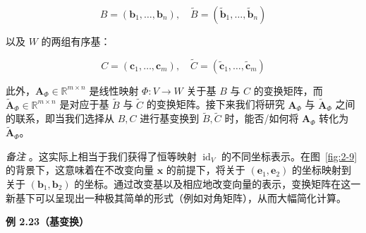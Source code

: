 \begin{equation}
B = (\boldsymbol{b}_1, \ldots, \boldsymbol{b}_n), \quad \tilde{B} = (\tilde{\boldsymbol{b}}_1, \ldots, \tilde{\boldsymbol{b}}_n)
\tag{2.98}\label{eq:2-98}
\end{equation}

以及 $ W $ 的两组有序基：

\begin{equation}
C = (\boldsymbol{c}_1, \ldots, \boldsymbol{c}_m), \quad \tilde{C} = (\tilde{\boldsymbol{c}}_1, \ldots, \tilde{\boldsymbol{c}}_m)
\tag{2.99}\label{eq:2-99}
\end{equation}

此外，$ \boldsymbol{A}_\Phi \in \mathbb{R}^{m \times n} $ 是线性映射 $ \Phi : V \to W $ 关于基 $ B $ 与 $ C $ 的变换矩阵，而 $ \tilde{\boldsymbol{A}}_\Phi \in \mathbb{R}^{m \times n} $ 是对应于基 $ \tilde{B} $ 与 $ \tilde{C} $ 的变换矩阵。接下来我们将研究 $ \boldsymbol{A}_\Phi $ 与 $ \tilde{\boldsymbol{A}}_\Phi $ 之间的联系，即当我们选择从 $ B, C $ 进行基变换到 $ \tilde{B}, \tilde{C} $ 时，能否/如何将 $ \boldsymbol{A}_\Phi $ 转化为 $ \tilde{\boldsymbol{A}}_\Phi $。

\emph{备注} 。这实际上相当于我们获得了恒等映射 $ \operatorname{id}_V $ 的不同坐标表示。在图~\ref{fig:2-9} 的背景下，这意味着在不改变向量 $ \boldsymbol{x} $ 的前提下，将关于 $ (\boldsymbol{e}_1, \boldsymbol{e}_2) $ 的坐标映射到关于 $ (\boldsymbol{b}_1, \boldsymbol{b}_2) $ 的坐标。通过改变基以及相应地改变向量的表示，变换矩阵在这一新基下可以呈现出一种极其简单的形式（例如对角矩阵），从而大幅简化计算。

\begin{notebox}
\textbf{例 2.23（基变换）}
\end{notebox}

